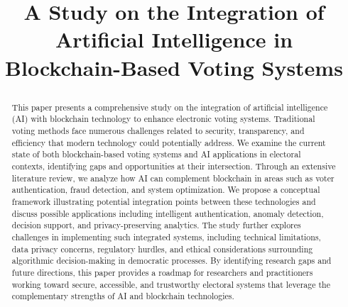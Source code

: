 \documentclass[conference]{IEEEtran}
\begin{document}
\title{A Study on the Integration of Artificial Intelligence in Blockchain-Based Voting Systems\\
{}

}

\author{
    \and
}

\maketitle

\begin{abstract}
This paper presents a comprehensive study on the integration of artificial intelligence (AI) with blockchain technology to enhance electronic voting systems. Traditional voting methods face numerous challenges related to security, transparency, and efficiency that modern technology could potentially address. We examine the current state of both blockchain-based voting systems and AI applications in electoral contexts, identifying gaps and opportunities at their intersection. Through an extensive literature review, we analyze how AI can complement blockchain in areas such as voter authentication, fraud detection, and system optimization. We propose a conceptual framework illustrating potential integration points between these technologies and discuss possible applications including intelligent authentication, anomaly detection, decision support, and privacy-preserving analytics. The study further explores challenges in implementing such integrated systems, including technical limitations, data privacy concerns, regulatory hurdles, and ethical considerations surrounding algorithmic decision-making in democratic processes. By identifying research gaps and future directions, this paper provides a roadmap for researchers and practitioners working toward secure, accessible, and trustworthy electoral systems that leverage the complementary strengths of AI and blockchain technologies.
\end{abstract}
\end{document}
